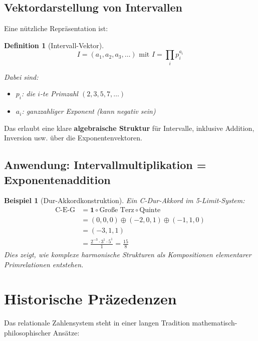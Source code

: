 \documentclass[11pt,a4paper]{article}
\newcommand{\primrel}[1]{\mathbf{#1}}
\newtheorem{definition}{Definition}[section]
\newtheorem{example}{Beispiel}[section]
\begin{document}
	\subsection{Vektordarstellung von Intervallen}
	
	Eine nützliche Repräsentation ist:
	
	\begin{definition}[Intervall-Vektor]
		\begin{equation}
			I = (a_1, a_2, a_3, \ldots) \text{ mit } I = \prod_{i} p_i^{a_i}
		\end{equation}
		
		Dabei sind:
		\begin{itemize}
			\item $p_i$: die $i$-te Primzahl $(2, 3, 5, 7, \ldots)$
			\item $a_i$: ganzzahliger Exponent (kann negativ sein)
		\end{itemize}
	\end{definition}
	
	Das erlaubt eine klare \textbf{algebraische Struktur} für Intervalle, inklusive Addition, Inversion usw. über die Exponentenvektoren.
	
	\subsection{Anwendung: Intervallmultiplikation = Exponentenaddition}
	
	\begin{example}[Dur-Akkordkonstruktion]
		Ein C-Dur-Akkord im 5-Limit-System:
		\begin{align}
			\text{C-E-G} &= \primrel{1} \circ \text{Große Terz} \circ \text{Quinte} \\
			&= (0,0,0) \oplus (-2,0,1) \oplus (-1,1,0) \\
			&= (-3,1,1) \\
			&= \frac{2^{-3} \cdot 3^1 \cdot 5^1}{1} = \frac{15}{8}
		\end{align}
		Dies zeigt, wie komplexe harmonische Strukturen als Kompositionen elementarer Primrelationen entstehen.
	\end{example}
	
	\section{Historische Präzedenzen}
	
	Das relationale Zahlensystem steht in einer langen Tradition mathematisch-philosophischer Ansätze:
	
\end{document}
